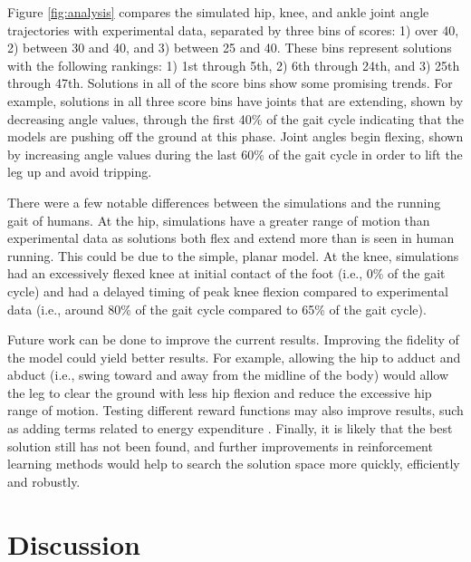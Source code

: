 \documentclass[graybox]{svmult}
\begin{document}
Figure \ref{fig:analysis} compares the simulated hip, knee, and ankle joint angle trajectories with experimental data, separated by three bins of scores: 1) over 40, 2) between 30 and 40, and 3) between 25 and 40. These bins represent solutions with the following rankings: 1) 1st through 5th, 2) 6th through 24th, and 3) 25th through 47th.
Solutions in all of the score bins show some promising trends. For example, solutions in all three score bins have joints that are extending, shown by decreasing angle values, through the first 40\% of the gait cycle indicating that the models are pushing off the ground at this phase. Joint angles begin flexing, shown by increasing angle values during the last 60\% of the gait cycle in order to lift the leg up and avoid tripping.

There were a few notable differences between the simulations and the running gait of humans. At the hip, simulations have a greater range of motion than experimental data as solutions both flex and extend more than is seen in human running. This could be due to the simple, planar model. At the knee, simulations had an excessively flexed knee at initial contact of the foot (i.e., 0\% of the gait cycle) and had a delayed timing of peak knee flexion compared to experimental data (i.e., around 80\% of the gait cycle compared to 65\% of the gait cycle).

Future work can be done to improve the current results. Improving the fidelity of the model could yield better results. For example, allowing the hip to adduct and abduct (i.e., swing toward and away from the midline of the body)  would allow the leg to clear the ground with less hip flexion and reduce the excessive hip range of motion. Testing different reward functions may also improve results, such as adding terms related to energy expenditure \cite{wang2012optimizing}. Finally, it is likely that the best solution still has not been found, and further improvements in reinforcement learning methods would help to search the solution space more quickly, efficiently and robustly.

\section{Discussion}
\end{document}
